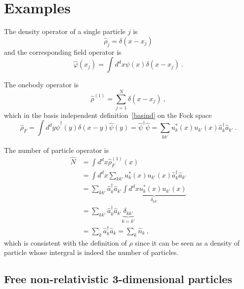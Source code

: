 \section{Examples} 

    The density operator of a single particle $j$ is 
    \begin{equation*}
        \hat \rho_j = \delta (x - x_j)
    \end{equation*}
    and the corresponding field operator is 
    \begin{equation*}
        \hat \varphi (x_j) = \int d^d x  \psi (x) \delta (x - x_j) ~.
    \end{equation*}

    The onebody operator is 
    \begin{equation*}
        \hat \rho^{(1)} = \sum_{j=1}^{N} \delta (x - x_j) ~,
    \end{equation*}
    which in the basis independent definition~\eqref{basind} on the Fock space 
    \begin{equation*}
        \hat \rho_F = \int d^d y \hat \psi^\dagger (y) \delta (x - y) \hat \psi (y) = \hat \psi^\dagger \hat \psi = \sum_{kk'} u_k^* (x) u_{k'} (x) \hat a^\dagger_k \hat a_{k'} ~.
    \end{equation*}

    The number of particle operator is 
    \begin{equation*}
    \begin{aligned}
        \hat N & = \int d^d x \hat \rho^{(1)}_F (x) \\ & = \int d^d x \sum_{kk'} u^*_k (x) u_{k'} (x) \hat a^\dagger_k \hat a_{k'} \\ & = \sum_{kk'} \hat a^\dagger_k \hat a_{k'} \underbrace{\int d^d x u^*_k (x) u_{k'} (x)}_{\delta_{kk'}} \\ & = \sum_{kk'} \hat a^\dagger_k \hat a_{k'} \underbrace{\delta_{kk'}}_{k = k'} \\ & = \sum_k \hat a^\dagger_k \hat a_k = \sum_k \hat n_k ~,
    \end{aligned}
    \end{equation*}
    which is consistent with the definition of $\rho$ since it can be seen as a density of particle whose intergral is indeed the number of particles.

\subsection{Free non-relativistic 3-dimensional particles} 


